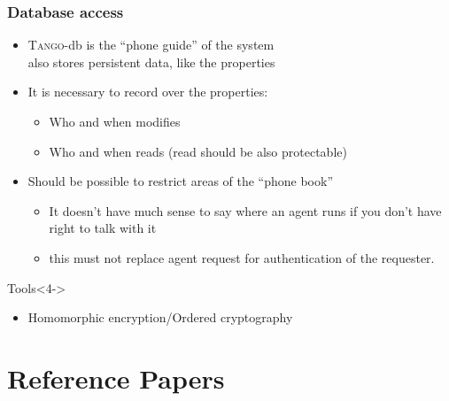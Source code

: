 \documentclass{beamer}
\newcommand{\tango}{\textsc{Tango}}
\begin{document}
\begin{frame}
\frametitle{Database access}
    \begin{itemize}
        \item \tango-db is the ``phone guide'' of the system\\also stores persistent data, like the properties
        \item<2-> It is necessary to record over the properties:
        \begin{itemize}
            \item<2-> Who and when modifies
            \item<2-> Who and when reads (read should be also protectable)
        \end{itemize}
        \item<3-> Should be possible to restrict areas of the ``phone book''
        \begin{itemize}
            \item<3-> It doesn't have much sense to say where an agent runs if you don't have right to talk with it
            \item<3-> this must not replace agent request for authentication of the requester.
        \end{itemize}
    \end{itemize}
    \begin{alertblock}{Tools}<4->
        \begin{itemize}
            \item Homomorphic encryption/Ordered cryptography
        \end{itemize}
    \end{alertblock}
\end{frame}

\section{Reference Papers}

\frame{\tableofcontents[sectionstyle=show/hide,subsectionstyle=show/show/hide]}
\end{document}
